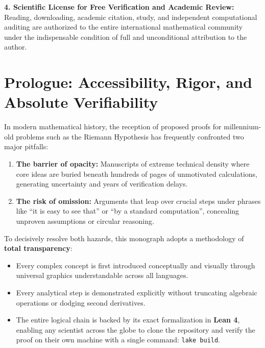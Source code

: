 \documentclass[11pt,a4paper]{article}
\theoremstyle{definition}
\theoremstyle{remark}
\begin{document}
\begin{center}
{{\vspace{0.3em}
\textbf{4. Scientific License for Free Verification and Academic Review:}\\
Reading, downloading, academic citation, study, and independent computational auditing are authorized to the entire international mathematical community under the indispensable condition of full and unconditional attribution to the author.
\vspace{0.3em}
}}
\end{center}

\vspace{1.5em}

\section*{Prologue: Accessibility, Rigor, and Absolute Verifiability}

In modern mathematical history, the reception of proposed proofs for millennium-old problems such as the Riemann Hypothesis has frequently confronted two major pitfalls:
\begin{enumerate}
    \item \textbf{The barrier of opacity:} Manuscripts of extreme technical density where core ideas are buried beneath hundreds of pages of unmotivated calculations, generating uncertainty and years of verification delays.
    \item \textbf{The risk of omission:} Arguments that leap over crucial steps under phrases like ``it is easy to see that'' or ``by a standard computation'', concealing unproven assumptions or circular reasoning.
\end{enumerate}

To decisively resolve both hazards, this monograph adopts a methodology of \textbf{total transparency}:
\begin{itemize}
    \item Every complex concept is first introduced conceptually and visually through universal graphics understandable across all languages.
    \item Every analytical step is demonstrated explicitly without truncating algebraic operations or dodging second derivatives.
    \item The entire logical chain is backed by its exact formalization in \textbf{Lean 4}, enabling any scientist across the globe to clone the repository and verify the proof on their own machine with a single command: \texttt{lake build}.
\end{itemize}
\end{document}
